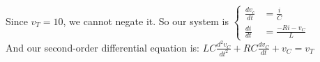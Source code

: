 \documentclass[preview]{standalone}
\begin{document}
\begin{center}
Since $v_T = 10$, we cannot negate it. So our system is \(\left\{
                        \begin{aligned}
                            \frac{dv_c}{dt} &= \frac{i}{C} \\
                            \frac{di}{dt} &= \frac{-Ri - v_C}{L}
                        \end{aligned}
                        \right.\) \\
                    And our second-order differential equation is: 
                    $LC\frac{d^2v_C}{dt^2} + RC\frac{d v_C}{dt} + v_C = v_T$
\end{center}
\end{document}
